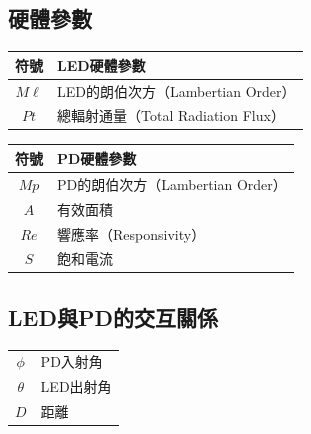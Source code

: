 

\onehalfspacing

\subsection*{硬體參數}

\begin{longtable}[l]{cl}
    符號 & LED硬體參數\\ \hline
    $M\ell$ & LED的朗伯次方（Lambertian Order）\\
    $Pt$ & 總輻射通量（Total Radiation Flux） 
\end{longtable}

\begin{longtable}[l]{cl}
    符號 & PD硬體參數\\ \hline
    $Mp$ & PD的朗伯次方（Lambertian Order）\\
    $A$ & 有效面積\\
    $Re$ & 響應率（Responsivity）\\
    $S$ &飽和電流
\end{longtable}


\onehalfspacing

\subsection*{LED與PD的交互關係}

\begin{longtable}[l]{cl}
    $\phi$ & PD入射角\\
    $\theta$ & LED出射角\\
    $D$&距離\\
\end{longtable}

